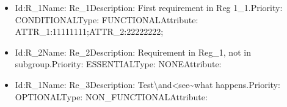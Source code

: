 \documentclass[12pt]{article}
\begin{document}
\begin{itemize}
\item Id:R\_1\newline Name: Re\_1\newline Description: First requirement in Reg 1\_1.\newline Priority: CONDITIONAL\newline Type: FUNCTIONAL\newline Attribute: ATTR\_1:11111111;ATTR\_2:22222222;
\item Id:R\_2\newline Name: Re\_2\newline Description: Requirement in Reg\_1, not in subgroup.\newline Priority: ESSENTIAL\newline Type: NONE\newline Attribute: 
\item Id:R\_1\newline Name: Re\_3\newline Description: Test\textbackslash and\textless see\textasciitilde what happens.\newline Priority: OPTIONAL\newline Type: NON\_FUNCTIONAL\newline Attribute: 
\end{itemize}
\end{document}
